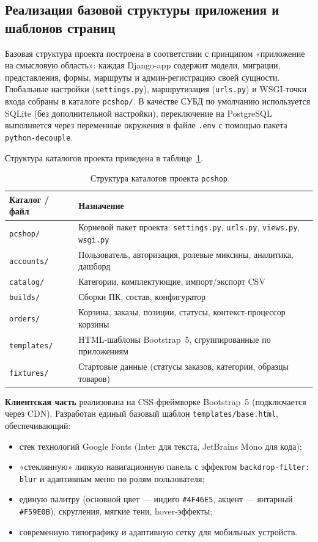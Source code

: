 \documentclass[14pt, a4paper]{extarticle}
\begin{document}
\subsection{Реализация базовой структуры приложения и шаблонов страниц}

Базовая структура проекта построена в соответствии с принципом «приложение на смысловую область»: каждая Django-app содержит модели, миграции, представления, формы, маршруты и админ-регистрацию своей сущности. Глобальные настройки (\texttt{settings.py}), маршрутизация (\texttt{urls.py}) и WSGI-точки входа собраны в каталоге \texttt{pcshop/}. В качестве СУБД по умолчанию используется SQLite (без дополнительной настройки), переключение на PostgreSQL выполняется через переменные окружения в файле \texttt{.env} с помощью пакета \texttt{python-decouple}.

Структура каталогов проекта приведена в таблице~\ref{tab:project-layout}.

\begin{table}[ht!]
\caption{Структура каталогов проекта \texttt{pcshop}}
\label{tab:project-layout}
\small
\begin{tabularx}{\textwidth}{|>{\RaggedRight\arraybackslash}p{}|>{\RaggedRight\arraybackslash}X|}
\hline
\textbf{Каталог / файл} & \textbf{Назначение} \\ \hline
\texttt{pcshop/} & Корневой пакет проекта: \texttt{settings.py}, \texttt{urls.py}, \texttt{views.py}, \texttt{wsgi.py} \\ \hline
\texttt{accounts/} & Пользователь, авторизация, ролевые миксины, аналитика, дашборд \\ \hline
\texttt{catalog/} & Категории, комплектующие, импорт/экспорт CSV \\ \hline
\texttt{builds/} & Сборки ПК, состав, конфигуратор \\ \hline
\texttt{orders/} & Корзина, заказы, позиции, статусы, контекст-процессор корзины \\ \hline
\texttt{templates/} & HTML-шаблоны Bootstrap~5, сгруппированные по приложениям \\ \hline
\texttt{fixtures/} & Стартовые данные (статусы заказов, категории, образцы товаров) \\ \hline
\end{tabularx}
\end{table}

\textbf{Клиентская часть} реализована на CSS-фреймворке Bootstrap~5 (подключается через CDN). Разработан единый базовый шаблон \texttt{templates/base.html}, обеспечивающий:
\begin{itemize}
    \item стек технологий Google Fonts (Inter для текста, JetBrains Mono для кода);
    \item «стеклянную» липкую навигационную панель с эффектом \texttt{backdrop-filter: blur} и адаптивным меню по ролям пользователя;
    \item единую палитру (основной цвет --- индиго \texttt{\#4F46E5}, акцент --- янтарный \texttt{\#F59E0B}), скругления, мягкие тени, hover-эффекты;
    \item современную типографику и адаптивную сетку для мобильных устройств.
\end{itemize}
\end{document}
